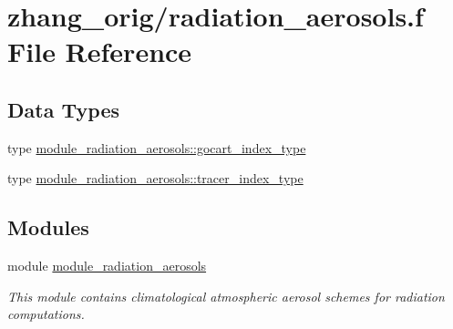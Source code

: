 \hypertarget{zhang__orig_2radiation__aerosols_8f}{}\section{zhang\+\_\+orig/radiation\+\_\+aerosols.f File Reference}
\label{zhang__orig_2radiation__aerosols_8f}
\subsection*{Data Types}
\begin{DoxyCompactItemize}
\item 
type \hyperlink{structmodule__radiation__aerosols_1_1gocart__index__type}{module\+\_\+radiation\+\_\+aerosols\+::gocart\+\_\+index\+\_\+type}
\item 
type \hyperlink{structmodule__radiation__aerosols_1_1tracer__index__type}{module\+\_\+radiation\+\_\+aerosols\+::tracer\+\_\+index\+\_\+type}
\end{DoxyCompactItemize}
\subsection*{Modules}
\begin{DoxyCompactItemize}
\item 
module \hyperlink{namespacemodule__radiation__aerosols}{module\+\_\+radiation\+\_\+aerosols}
\begin{DoxyCompactList}\small\item\em This module contains climatological atmospheric aerosol schemes for radiation computations. \end{DoxyCompactList}\end{DoxyCompactItemize}
